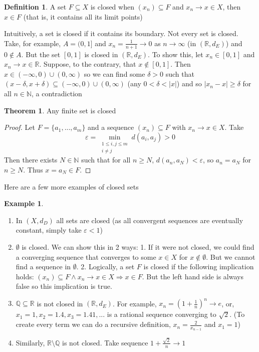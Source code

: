 \documentclass[11pt,a4paper]{article}
\theoremstyle{definition}
\newtheorem{definition}{Definition}[section]
\newtheorem{theorem}{Theorem}[section]
\newtheorem{example}{Example}[section]
\begin{document}
\begin{definition}
    A set $F \subseteq X$ is closed when $(x_n) \subseteq F$ and $x_n \to x\in X$, then $x \in F$ (that is, it contains all its limit points)
\end{definition} \noindent
Intuitively, a set is closed if it contains its boundary. Not every set is closed. Take, for example, $A = (0,1]$ and $x_n = \frac{1}{n+1} \to 0$ as $n \to \infty$ (in $(\mathbb{R}, d_E)$) and $0 \notin A$. But the set $[0,1]$ is closed in $(\mathbb{R}, d_E)$. To show this, let $x_n \in [0,1]$ and $x_n \to x \in \mathbb{R}$. Suppose, to the contrary, that $x \notin [0,1]$. Then $x \in (-\infty, 0) \cup (0, \infty)$ so we can find some $\delta > 0$ such that $(x-\delta, x+\delta) \subseteq (-\infty, 0) \cup (0, \infty)$ (any $0<\delta < |x|$) and so $|x_n - x| \geq \delta$ for all $n\in \mathbb{N}$, a contradiction
\newpage
\begin{theorem}
    Any finite set is closed
\end{theorem}
\begin{proof}
    Let $F = \{a_1, ..., a_m\}$ and a sequence $(x_n) \subseteq F$ with $x_n \to x \in X$. Take \[\varepsilon = \min \limits _{\substack{1\le i,j\le m \\ i \ne j}}{d(a_i, a_j)} >0\]Then there exists $N \in \mathbb{N}$ such that for all $n\ge N$, $d(a_n, a_N)< \varepsilon$, so $a_n = a_N$ for $n\ge N$. Thus $x=a_N \in F$.
\end{proof}
\noindent
Here are a few more examples of closed sets

\begin{example}
    \begin{enumerate}
        \item In $(X, d_D)$ all sets are closed (as all convergent sequences are eventually constant, simply take $\varepsilon < 1$)
        \item $\emptyset$ is closed. We can show this in 2 ways: 1. If it were not closed, we could find a converging sequence that converges to some $x \in X$ for $x \notin \emptyset$. But we cannot find a sequence in $\emptyset$. 2. Logically, a set $F$ is closed if the following implication holds: $(x_n) \subseteq F \land x_n \to x \in X \Longrightarrow x \in F$. But the left hand side is always false so this implication is true.
        
        \item $\mathbb{Q} \subseteq \mathbb{R}$ is not closed in $(\mathbb{R}, d_E)$. For example, $x_n = (1+\frac{1}{n})^n \to e$, or, $x_1 = 1, x_2 = 1.4, x_3 = 1.41, ...$ is a rational sequence converging to $\sqrt{2}$. (To create every term we can do a recursive definition, $x_n = \frac{2}{x_{n-1}}$ and $x_1 = 1$)
        \item Similarly, $\mathbb{R} \setminus \mathbb{Q}$ is not closed. Take sequence $1 + \frac{\sqrt{2}}{n} \to 1$
    \end{enumerate}
\end{example}
\end{document}
